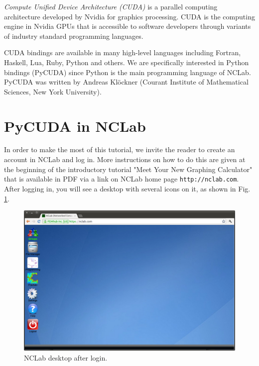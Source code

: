 \documentclass[article,A4,12pt]{llncs}
\begin{document}
{\em Compute Unified Device Architecture (CUDA)} is a parallel computing architecture 
developed by Nvidia for graphics processing. CUDA is the computing engine in 
Nvidia GPUs that is accessible to software developers through variants of 
industry standard programming languages.

CUDA bindings are available in many high-level languages including Fortran,
Haskell, Lua, Ruby, Python and others. We are specifically interested 
in Python bindings (PyCUDA) since Python is the main programming language 
of NCLab. PyCUDA was written by Andreas Kl\"ockner (Courant Institute 
of Mathematical Sciences, New York University).





\section{PyCUDA in NCLab}

In order to make the most of this tutorial, we invite the 
reader to create an account in NCLab and log in. More instructions 
on how to do this are given at the beginning of the introductory 
tutorial "Meet Your New Graphing Calculator" that is available in 
PDF via a link on NCLab home page {\tt http://nclab.com}. \\

\noindent
After logging in, you will see a desktop with several icons on it,
as shown in Fig. \ref{fig:desktop}. 

\begin{figure}[!ht]
\begin{center}
\includegraphics[width=\textwidth]{img/desktop.png}
\end{center}
\caption{NCLab desktop after login.}
\label{fig:desktop}
\end{figure}
\end{document}
